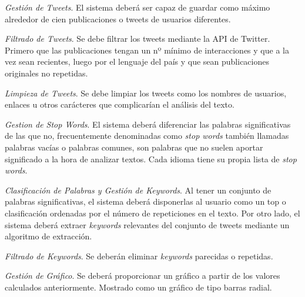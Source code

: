 \begin{enumerate}
{    \textit{Gestión de Tweets}. El sistema deberá ser capaz de guardar como máximo alrededor de cien publicaciones o tweets de usuarios diferentes.
    \begin{enumerate}{\renewcommand{\labelenumii}{R.F. \arabic{enumi}.\arabic{enumii}}
        \item
        \textit{Filtrado de Tweets}. Se debe filtrar los tweets mediante la API de Twitter. Primero que las publicaciones tengan un nº mínimo de interacciones y que a la vez sean recientes, luego por el lenguaje del país y que sean publicaciones originales no repetidas.
        \item
        \textit{Limpieza de Tweets}. Se debe limpiar los tweets como los nombres de usuarios, enlaces u otros carácteres que complicarían el análisis del texto.
        \begin{enumerate}{\renewcommand{\labelenumiii}{R.F. \arabic{enumi}.\arabic{enumii}.\arabic{enumiii}}
            \item
            \textit{Gestion de Stop Words}. El sistema deberá diferenciar las palabras significativas de las que no, frecuentemente denominadas como \textit{stop words} también llamadas palabras vacías o palabras comunes, son palabras que no suelen aportar significado a la hora de analizar textos. Cada idioma tiene su propia lista de \textit{stop words}.
            }\end{enumerate}
        }\end{enumerate}
        \item
        \textit{Clasificación de Palabras y Gestión de Keywords}. Al tener un conjunto de palabras significativas, el sistema deberá disponerlas al usuario como un top o clasificación ordenadas por el número de repeticiones en el texto. Por otro lado, el sistema deberá extraer \textit{keywords} relevantes del conjunto de tweets mediante un algoritmo de extracción.
        \begin{enumerate}{\renewcommand{\labelenumii}{R.F. \arabic{enumi}.\arabic{enumii}}
            \item
            \textit{Filtrado de Keywords}. Se deberán eliminar \textit{keywords} parecidas o repetidas.
            \item
            \textit{Gestión de Gráfico}. Se deberá proporcionar un gráfico a partir de los valores calculados anteriormente. Mostrado como un gráfico de tipo barras radial.
            \begin{enumerate}{\renewcommand{\labelenumiii}{R.F. \arabic{enumi}.\arabic{enumii}.\arabic{enumiii}}
}
\end{enumerate}}
\end{enumerate}}
\end{enumerate}
